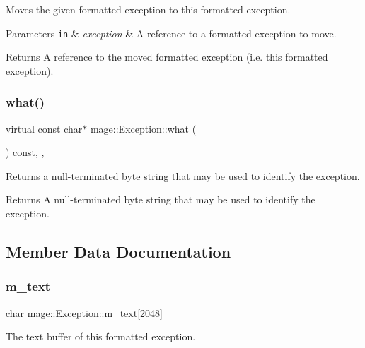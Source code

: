 Moves the given formatted exception to this formatted exception.


\begin{DoxyParams}[1]{Parameters}
\mbox{\tt in}  & {\em exception} & A reference to a formatted exception to move. \\
\hline
\end{DoxyParams}
\begin{DoxyReturn}{Returns}
A reference to the moved formatted exception (i.\+e. this formatted exception). 
\end{DoxyReturn}
\hypertarget{classmage_1_1_exception_a2ec064e970c232b09c100e151195a3e4}{}\label{classmage_1_1_exception_a2ec064e970c232b09c100e151195a3e4} 
\subsubsection{\texorpdfstring{what()}{what()}}
{\footnotesize\ttfamily virtual const char$\ast$ mage\+::\+Exception\+::what (\begin{DoxyParamCaption}{ }\end{DoxyParamCaption}) const\hspace{0.3cm}{\ttfamily [override]}, {\ttfamily [virtual]}, {\ttfamily [noexcept]}}

Returns a null-\/terminated byte string that may be used to identify the exception.

\begin{DoxyReturn}{Returns}
A null-\/terminated byte string that may be used to identify the exception. 
\end{DoxyReturn}


\subsection{Member Data Documentation}
\hypertarget{classmage_1_1_exception_a11062fc70be58cf87faf2e1f8a4bebe7}{}\label{classmage_1_1_exception_a11062fc70be58cf87faf2e1f8a4bebe7} 
\subsubsection{\texorpdfstring{m\+\_\+text}{m\_text}}
{\footnotesize\ttfamily char mage\+::\+Exception\+::m\+\_\+text\mbox{[}2048\mbox{]}\hspace{0.3cm}{\ttfamily [private]}}

The text buffer of this formatted exception. 